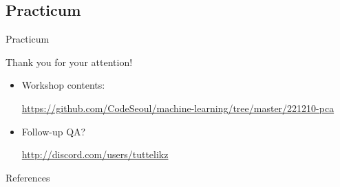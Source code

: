 \documentclass{beamer}
\begin{document}
    \subsection{Practicum}
    \begin{frame}{Practicum}
      \begin{center}
      \begin{huge}Thank you for your attention!\end{huge}
      \end{center}

        \vspace{0.5cm}
        \begin{itemize}
          \item Workshop contents: \\
            \begin{small}\url{https://github.com/CodeSeoul/machine-learning/tree/master/221210-pca}
            \end{small}
          \item Follow-up QA? \\ 
            \begin{small}\url{http://discord.com/users/tuttelikz}
            \end{small}
        \end{itemize}

    \end{frame}

    \begin{frame}{References}
      \printbibliography  
    \end{frame}
\end{document}

